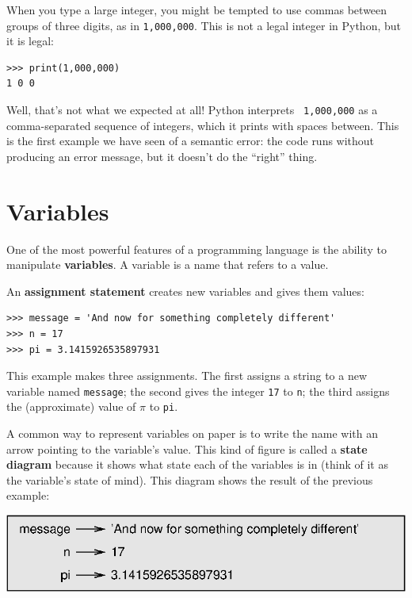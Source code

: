 When you type a large integer, you might be tempted to use commas
between groups of three digits, as in {\tt 1,000,000}.  This is not a
legal integer in Python, but it is legal:

\beforeverb
\begin{verbatim}
>>> print(1,000,000)
1 0 0
\end{verbatim}
\afterverb
%
Well, that's not what we expected at all!  Python interprets {\tt
  1,000,000} as a comma-separated sequence of integers, which it
prints with spaces between.
%
%
This is the first example we have seen of a semantic error: the code
runs without producing an error message, but it doesn't do the
``right'' thing.


\section{Variables}

One of the most powerful features of a programming language is the
ability to manipulate {\bf variables}.  A variable is a name that
refers to a value.

An {\bf assignment statement} creates new variables and gives
them values:

\beforeverb
\begin{verbatim}
>>> message = 'And now for something completely different'
>>> n = 17
>>> pi = 3.1415926535897931
\end{verbatim}
\afterverb
%
This example makes three assignments.  The first assigns a string
to a new variable named {\tt message};
the second gives the integer {\tt 17} to {\tt n}; the third
assigns the (approximate) value of $\pi$ to {\tt pi}.


A common way to represent variables on paper is to write the name with
an arrow pointing to the variable's value.  This kind of figure is
called a {\bf state diagram} because it shows what state each of the
variables is in (think of it as the variable's state of mind).
This diagram shows the result of the previous example:

\beforefig
\centerline{\includegraphics{figs/state2.eps}}
\afterfig

